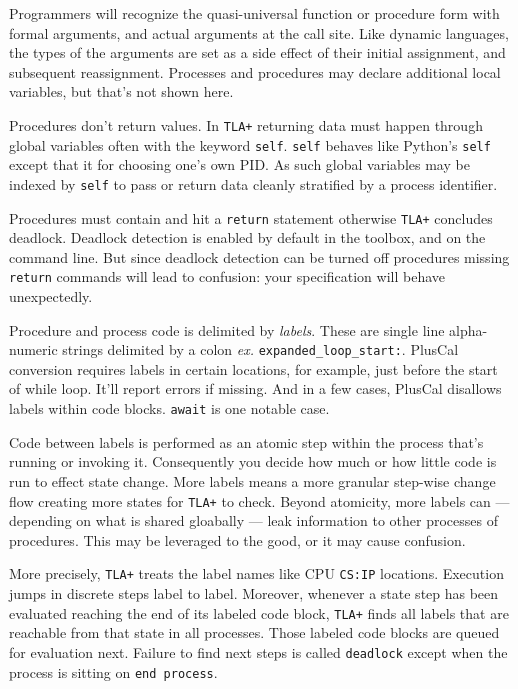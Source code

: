 \documentclass[twocolumn]{article}
\begin{document}
Programmers will recognize the quasi-universal function or procedure form with formal arguments, and actual arguments at the call site. Like dynamic languages, the types of the arguments are set as a side effect of their initial assignment, and subsequent reassignment. Processes and procedures may declare additional local variables, but that's not shown here. 

Procedures don't return values. In \texttt{TLA+} returning data must happen through global variables often with the keyword \texttt{self}. \texttt{self} behaves like Python's \texttt{self} except that it for choosing one's own PID. As such global variables may be indexed by \texttt{self} to pass or return data cleanly stratified by a process identifier.

Procedures must contain and hit a \texttt{return} statement otherwise \texttt{TLA+} concludes deadlock. Deadlock detection is enabled by default in the toolbox, and on the command line. But since deadlock detection can be turned off procedures missing \texttt{return} commands will lead to confusion: your specification will behave unexpectedly. 

Procedure and process code is delimited by \emph{labels}. These are single line alpha-numeric strings delimited by a colon \emph{ex.} \texttt{expanded\_loop\_start:}. PlusCal conversion requires labels in certain locations, for example, just before the start of while loop. It'll report errors if missing. And in a few cases, PlusCal disallows labels within code blocks. \texttt{await} is one notable case.

Code between labels is performed as an atomic step within the process that's running or invoking it. Consequently you decide how much or how little code is run to effect state change. More labels means a more granular step-wise change flow creating more states for \texttt{TLA+} to check. Beyond atomicity, more labels can --- depending on what is shared gloabally --- leak information to other processes of procedures. This may be leveraged to the good, or it may cause confusion.

More precisely, \texttt{TLA+} treats the label names like CPU \texttt{CS:IP} locations. Execution jumps in discrete steps label to label. Moreover, whenever a state step has been evaluated reaching the end of its labeled code block, \texttt{TLA+} finds all labels that are reachable from that state in all processes. Those labeled code blocks are queued for evaluation next. Failure to find next steps is called \texttt{deadlock} except when the process is sitting on \texttt{end process}. 
\end{document}

